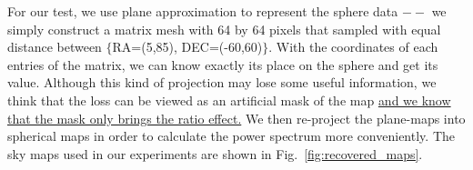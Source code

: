 \documentclass[floatfix]{emulateapj}
\begin{document}
For our test, we use plane approximation to represent the sphere data $--$ we simply construct a matrix mesh with 64 by 64 pixels that sampled with equal distance between $\lbrace$RA=(5,85), DEC=(-60,60)$\rbrace$. With the coordinates of each entries of the matrix, we can know exactly its place on the sphere and get its value. Although this kind of projection may lose some useful information, we think that the loss can be viewed as an artificial mask of the map \underline{and we know that the mask only brings the ratio effect.} We then re-project the plane-maps into spherical maps in order to calculate the power spectrum  more conveniently. The sky maps used in our experiments are shown in Fig.~\ref{fig:recovered_maps}.
\begin{figure}[htpb]
\centering
\mbox{
}
\mbox{
 }
\end{figure}
\end{document}
